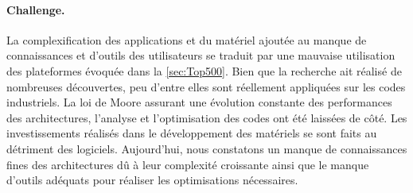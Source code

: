         \paragraph{Challenge.}  
        
            La complexification des applications et du matériel ajoutée au manque de connaissances et d'outils des utilisateurs se traduit par une mauvaise utilisation des plateformes évoquée dans la \autoref{sec:Top500}. Bien que la recherche ait réalisé de nombreuses découvertes, peu d'entre elles sont réellement appliquées sur les codes industriels. La loi de Moore assurant une évolution constante des performances des architectures, l’analyse et l’optimisation des codes ont été laissées de côté. Les investissements réalisés dans le développement des matériels se sont faits au détriment des logiciels. Aujourd'hui, nous constatons un manque de connaissances fines des architectures dû à leur complexité croissante ainsi que le manque d'outils adéquats pour réaliser les optimisations nécessaires.
        
